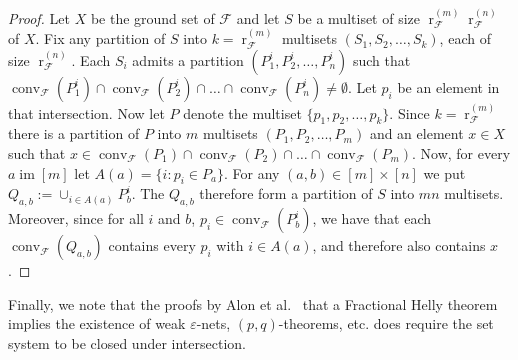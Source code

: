 \documentclass[11pt]{article}
\newcommand{\F}{\mathcal{F}}
\DeclareMathOperator{\conv}{conv}
\DeclareMathOperator{\rad}{r}
\DeclareMathOperator{\im}{im}
\begin{document}
\begin{proof}
  Let $X$ be the ground set of $\F$ and let $S$ be a multiset of size $\rad^{(m)}_\F\rad^{(n)}_\F$ of $X$. Fix any partition of $S$ into $k = \rad^{(m)}_\F$ multisets $(S_1, S_2, \ldots, S_k)$, each of size $\rad^{(n)}_\F$. Each $S_i$ admits a partition $(P^i_1, P^i_2, \ldots, P^i_n)$ such that $\conv_{\F}(P^i_1) \cap \conv_{\F}(P^i_2) \cap \ldots  \cap \conv_{\F}(P^i_n)\neq \emptyset$. Let $p_i$ be an element in that intersection. Now let $P$ denote the multiset $\{p_1, p_2, \ldots, p_k\}$. Since $k = \rad^{(m)}_\F$ there is a partition of $P$ into $m$ multisets $(P_1,P_2, \ldots, P_m)$ and an element $x \in X$ such that $x \in \conv_{\F}(P_1) \cap \conv_{\F}(P_2) \cap \ldots  \cap \conv_{\F}(P_m)$. Now, for every $a \im [m]$ let $A(a) = \{i \colon p_i \in P_a\}$. For any $(a,b) \in [m]\times [n]$ we put $Q_{a,b} := \cup_{i \in A(a)} P^i_b$. The $Q_{a,b}$ therefore form a partition of $S$ into $mn$ multisets. Moreover, since for all $i$ and $b$, $p_i\in \conv_{\F}(P_b^i)$, we have that each $\conv_\F(Q_{a,b})$ contains every $p_i$ with $i \in A(a)$, and therefore also contains $x$.
\end{proof}
%
\bigskip
%
Finally, we note that the proofs by Alon et al.~\cite{transversal-hypergraph} that a Fractional Helly theorem implies the existence of weak $\varepsilon$-nets, $(p,q)$-theorems, etc. does require the set system to be closed under intersection.
%
%
\end{document}
